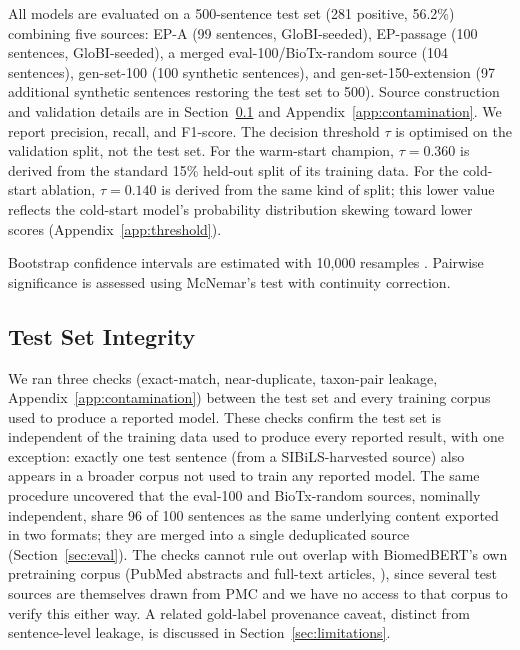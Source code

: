 \documentclass[11pt]{article}
\begin{document}
All models are evaluated on a 500-sentence test set (281 positive,
56.2\%) combining five sources: EP-A (99 sentences, GloBI-seeded),
EP-passage (100 sentences, GloBI-seeded), a merged eval-100/BioTx-random
source (104 sentences), gen-set-100 (100 synthetic sentences), and
gen-set-150-extension (97 additional synthetic sentences restoring
the test set to 500). Source construction and validation details are
in Section~\ref{sec:contamination} and Appendix~\ref{app:contamination}.
We report precision, recall, and F1-score.
The decision threshold $\tau$ is optimised on the validation split,
not the test set. For the warm-start champion, $\tau = 0.360$ is derived
from the standard 15\% held-out split of its training data. For the
cold-start ablation, $\tau = 0.140$ is derived from the same kind of split;
this lower value reflects the cold-start model's probability
distribution skewing toward lower scores (Appendix~\ref{app:threshold}).

Bootstrap confidence intervals are estimated with 10,000 resamples
\citep{efron1993introduction}.
Pairwise significance is assessed using McNemar's test
\citep{mcnemar1947note} with continuity correction.

\subsection{Test Set Integrity}
\label{sec:contamination}

We ran three checks (exact-match, near-duplicate, taxon-pair leakage,
Appendix~\ref{app:contamination}) between the test set and every
training corpus used to produce a reported model. These checks confirm
the test set is independent of the training data used to produce every
reported result, with one exception: exactly one test sentence (from a
SIBiLS-harvested source) also appears in a broader corpus not used to
train any reported model. The same procedure uncovered that the
eval-100 and BioTx-random sources, nominally independent, share 96 of
100 sentences as the same underlying content exported in two formats;
they are merged into a single deduplicated source (Section~\ref{sec:eval}).
The checks cannot rule out overlap with BiomedBERT's own pretraining
corpus (PubMed abstracts and full-text articles,
\citealt{gu2021domain}), since several test sources are themselves
drawn from PMC and we have no access to that corpus to verify this
either way. A related gold-label provenance caveat, distinct from
sentence-level leakage, is discussed in Section~\ref{sec:limitations}.
\end{document}
